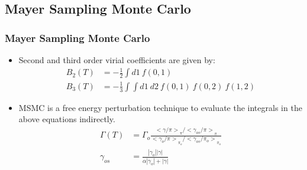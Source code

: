 \documentclass[xcolor=svgnames]{beamer}
\begin{document}
	\subsection{Mayer Sampling Monte Carlo}
        \begin{frame}
            \frametitle{Mayer Sampling Monte Carlo}
            \begin{itemize}
            \justifying
                \item Second and third order virial coefficients are given by:
                \begin{equation*}
                    \begin{aligned}
                        B_2(T) &= -\frac{1}{2} \displaystyle\int d1 ~ f(0,1)\\
                        B_3(T) &= -\frac{1}{3} \displaystyle\int \int d1~d2~f(0,1)~f(0,2)~f(1,2)
                    \end{aligned}
                \end{equation*}
                \item MSMC is a free energy perturbation technique to evaluate the integrals in the above equations indirectly.
                \begin{equation*}
                    \label{eq:MSMCworking}
                    \begin{aligned}
                        \Gamma (T) &= \Gamma_o \frac{{<\gamma/\pi>}_\pi / {<\gamma_{os}/\pi>}_\pi}{{<\gamma_o/\pi>}_{\pi_o} / {<\gamma_{os}/\pi_o>}_{\pi_o}}\\
                        \gamma_{os} &= \frac{|\gamma_o||\gamma|}{\alpha |\gamma_o| + |\gamma|}
                    \end{aligned}
                \end{equation*}
            \end{itemize}
        \end{frame}
\end{document}
